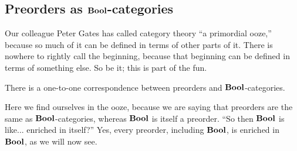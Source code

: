 \documentclass[7Sketches]{subfiles}
\begin{document}
\subsection{Preorders as $\mathbf{Bool}$-categories}%
\label{subsec.preorders_Bool_enriched}


Our colleague Peter Gates has called category theory ``a primordial ooze,'' because so much of it can be defined in terms of other parts of it. There is nowhere to rightly call the beginning, because that beginning can be defined in terms of something else. So be it; this is part of the fun.
%
%

\begin{theorem}%
\label{thm.preorder_is_bool_cat}%
%
There is a one-to-one correspondence between preorders and $\mathbf{Bool}$-categories.
\end{theorem}

Here we find ourselves in the ooze, because we are saying that preorders are the same as $\mathbf{Bool}$-categories, whereas $\mathbf{Bool}$ is itself a preorder. ``So then $\mathbf{Bool}$ is like... enriched in itself?'' Yes, every preorder, including $\mathbf{Bool}$, is enriched in $\mathbf{Bool}$, as we will now see.
\end{document}
